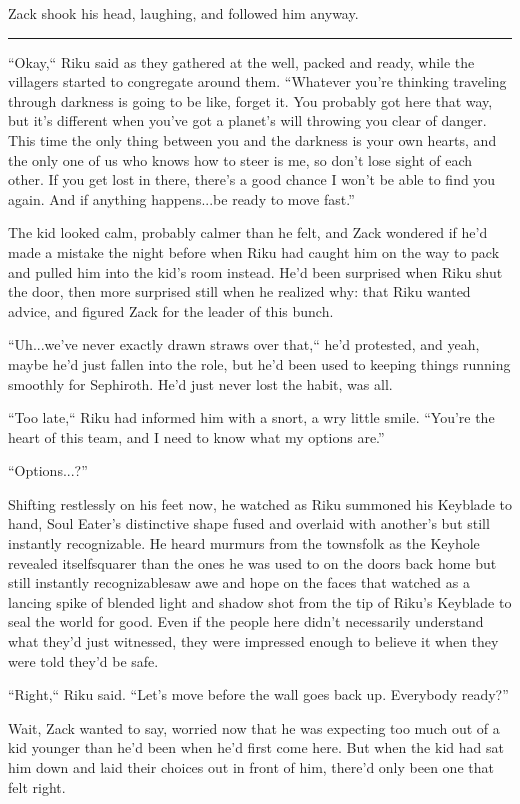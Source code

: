 Zack shook his head, laughing, and followed him anyway.

\fancybreak{\pfbreakdisplay}


``Okay,`` Riku said as they gathered at the well, packed and ready, while the villagers started to congregate around them. ``Whatever you're thinking traveling through darkness is going to be like, forget it. You probably got here that way, but it's different when you've got a planet's will throwing you clear of danger. This time the only thing between you and the darkness is your own hearts, and the only one of us who knows how to steer is me, so don't lose sight of each other. If you get lost in there, there's a good chance I won't be able to find you again. And if anything happens...be ready to move fast.''

The kid looked calm, probably calmer than he felt, and Zack wondered if he'd made a mistake the night before when Riku had caught him on the way to pack and pulled him into the kid's room instead. He'd been surprised when Riku shut the door, then more surprised still when he realized why: that Riku wanted advice, and figured Zack for the leader of this bunch.

``Uh...we've never exactly drawn straws over that,`` he'd protested, and yeah, maybe he'd just fallen into the role, but he'd been used to keeping things running smoothly for Sephiroth. He'd just never lost the habit, was all.

``Too late,`` Riku had informed him with a snort, a wry little smile. ``You're the heart of this team, and I need to know what my options are.''

``Options...?''

Shifting restlessly on his feet now, he watched as Riku summoned his Keyblade to hand, Soul Eater's distinctive shape fused and overlaid with another's but still instantly recognizable. He heard murmurs from the townsfolk as the Keyhole revealed itself\textemdash squarer than the ones he was used to on the doors back home but still instantly recognizable\textemdash saw awe and hope on the faces that watched as a lancing spike of blended light and shadow shot from the tip of Riku's Keyblade to seal the world for good. Even if the people here didn't necessarily understand what they'd just witnessed, they were impressed enough to believe it when they were told they'd be safe.

``Right,`` Riku said. ``Let's move before the wall goes back up. Everybody ready?''

Wait, Zack wanted to say, worried now that he was expecting too much out of a kid younger than he'd been when he'd first come here. But when the kid had sat him down and laid their choices out in front of him, there'd only been one that felt right.

